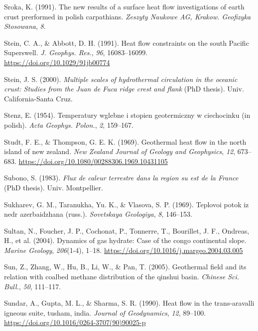 \documentclass[draft,linenumbers]{agujournal2018}
\begin{document}
\leavevmode{}%
Sroka, K. (1991). The new results of a surface heat flow investigations
of earth crust prerformed in polish carpathians. \emph{Zeszyty Naukowe
AG, Krakow. Geofizyka Stosowana}, \emph{8}.

\leavevmode{}%
Stein, C. A., \& Abbott, D. H. (1991). Heat flow constraints on the
south {Pacific Superswell}. \emph{J. Geophys. Res.}, \emph{96},
16083--16099. \url{https://doi.org/10.1029/91jb00774}

\leavevmode{}%
Stein, J. S. (2000). \emph{Multiple scales of hydrothermal circulation
in the oceanic crust: Studies from the {Juan de Fuca} ridge crest and
flank} (PhD thesis). Univ. California-Santa Cruz.

\leavevmode{}%
Stenz, E. (1954). Temperatury wglebne i stopien geotermiczny w
ciechocinku (in polish). \emph{Acta Geophys. Polon.}, \emph{2},
159--167.

\leavevmode{}%
Studt, F. E., \& Thompson, G. E. K. (1969). Geothermal heat flow in the
north island of new zealand. \emph{New Zealand Journal of Geology and
Geophysics}, \emph{12}, 673--683.
\url{https://doi.org/10.1080/00288306.1969.10431105}

\leavevmode{}%
Subono, S. (1983). \emph{Flux de caleur terrestre dans la region su est
de la {France}} (PhD thesis). Univ. Montpellier.

\leavevmode{}%
Sukharev, G. M., Taranukha, Yu. K., \& Vlasova, S. P. (1969). Teplovoi
potok iz nedr azerbaidzhana (russ.). \emph{Sovetskaya Geologiya},
\emph{8}, 146--153.

\leavevmode{}%
Sultan, N., Foucher, J. P., Cochonat, P., Tonnerre, T., Bourillet, J.
F., Ondreas, H., et al. (2004). Dynamics of gas hydrate: Case of the
congo continental slope. \emph{Marine Geology}, \emph{206}(1-4), 1--18.
\url{https://doi.org/10.1016/j.margeo.2004.03.005}

\leavevmode{}%
Sun, Z., Zhang, W., Hu, B., Li, W., \& Pan, T. (2005). Geothermal field
and its relation with coalbed methane distribution of the qinshui basin.
\emph{Chinese Sci. Bull.}, \emph{50}, 111--117.

\leavevmode{}%
Sundar, A., Gupta, M. L., \& Sharma, S. R. (1990). Heat flow in the
trans-aravalli igneous suite, tusham, india. \emph{Journal of
Geodynamics}, \emph{12}, 89--100.
\url{https://doi.org/10.1016/0264-3707(90)90025-p}
\end{document}
